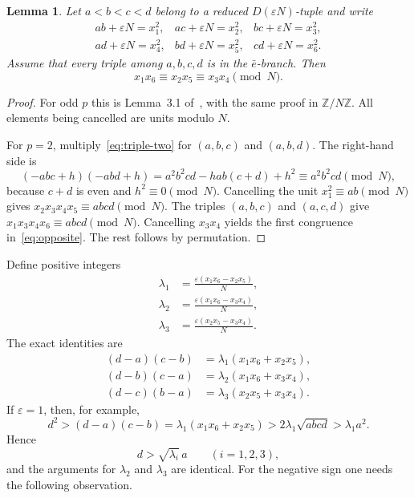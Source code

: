 \documentclass[11pt]{amsart}
\newtheorem{lemma}[theorem]{Lemma}
\theoremstyle{remark}
\newcommand{\Z}{\mathbb Z}
\newcommand{\eps}{\varepsilon}
\begin{document}
\begin{lemma}%
\label{lem:opposite}
Let $a<b<c<d$ belong to a reduced $D(\eps N)$-tuple and write
\[
\begin{array}{lll}
 ab+\eps N=x_1^2,&ac+\eps N=x_2^2,&bc+\eps N=x_3^2,\\
 ad+\eps N=x_4^2,&bd+\eps N=x_5^2,&cd+\eps N=x_6^2.
\end{array}
\]
Assume that every triple among $a,b,c,d$ is in the $\bar e$-branch.  Then
\begin{equation}\label{eq:opposite}
 x_1x_6\equiv x_2x_5\equiv x_3x_4\pmod N.
\end{equation}
\end{lemma}

\begin{proof}
For odd $p$ this is Lemma~3.1 of~\cite{DL}, with the same proof in
$\Z/N\Z$. All elements being cancelled are units modulo $N$.

For $p=2$, multiply~\eqref{eq:triple-two} for $(a,b,c)$ and $(a,b,d)$.
The right-hand side is
\[
 (-abc+h)(-abd+h)
 =a^2b^2cd-hab(c+d)+h^2\equiv a^2b^2cd\pmod N,
\]
because $c+d$ is even and $h^2\equiv0\pmod N$.  Cancelling the unit
$x_1^2\equiv ab\pmod N$ gives
$x_2x_3x_4x_5\equiv abcd\pmod N$.  The triples $(a,b,c)$ and $(a,c,d)$
give $x_1x_3x_4x_6\equiv abcd\pmod N$.  Cancelling $x_3x_4$ yields the
first congruence in~\eqref{eq:opposite}. The rest follows by permutation.
\end{proof}

Define positive integers
\begin{equation}\label{eq:lambdas}
\begin{split}
 \lambda_1&=\frac{\eps(x_1x_6-x_2x_5)}{N},\\
 \lambda_2&=\frac{\eps(x_1x_6-x_3x_4)}{N},\\
 \lambda_3&=\frac{\eps(x_2x_5-x_3x_4)}{N}.
\end{split}
\end{equation}
The exact identities are
\begin{equation}\label{eq:exact-lambdas}
\begin{split}
 (d-a)(c-b)&=\lambda_1(x_1x_6+x_2x_5),\\
 (d-b)(c-a)&=\lambda_2(x_1x_6+x_3x_4),\\
 (d-c)(b-a)&=\lambda_3(x_2x_5+x_3x_4).
\end{split}
\end{equation}
If $\eps=1$, then, for example,
\[
 d^2>(d-a)(c-b)
 =\lambda_1(x_1x_6+x_2x_5)
 >2\lambda_1\sqrt{abcd}>\lambda_1a^2.
\]
Hence
\begin{equation}\label{eq:lambda-positive-gap}
 d>\sqrt{\lambda_i}\,a\qquad(i=1,2,3),
\end{equation}
and the arguments for $\lambda_2$ and $\lambda_3$ are identical.
For the negative sign one needs the following observation.
\end{document}
